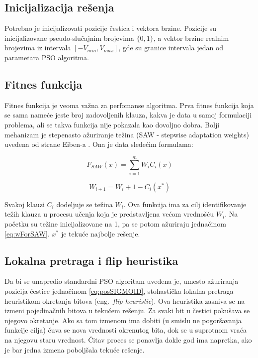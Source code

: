 \documentclass{article}
\begin{document}
\subsection{Inicijalizacija rešenja}
Potrebno je inicijalizovati pozicije čestica i vektora brzine. Pozicije su inicijalizovane pseudo-slučajnim brojevima $\{0,1\}$, a vektor brzine realnim brojevima iz intervala $[-V_{min}, V_{max}]$, gde su granice intervala jedan od parametara PSO algoritma.


\subsection{Fitnes funkcija}
Fitnes funkcija je veoma važna za perfomanse algoritma.
Prva fitnes funkcija koja se sama nameće jeste broj zadovoljenih klauza, kakva je data u samoj formulaciji problema, ali se takva funkcija nije pokazala kao dovoljno dobra. Bolji mehanizam je stepenasto ažuriranje težina (SAW - stepwise adaptation weights) uvedena od strane Eiben-a \cite{fitnes}. Ona je data sledećim formulama:

\begin{equation}\label{eq:SAW}
F_{SAW}(x) = \sum_{i=1}^{m} W_iC_i(x)
\end{equation}

\begin{equation}\label{eq:wForSAW}
W_{i+1} = W_{i} + 1 - C_i(x^*)
\end{equation}

Svakoj klauzi $C_i$ dodeljuje se težina $W_i$. Ova funkcija ima za cilj identifikovanje težih klauza u procesu učenja koja je predstavljena većom vrednošću $W_i$. Na početku su težine inicijalizovane na 1, pa se potom ažuriraju jednačinom \ref{eq:wForSAW}. $x^*$ je tekuće najbolje rešenje.


\subsection{Lokalna pretraga i flip heuristika}
Da bi se unapredio standardni PSO algoritam uvedena je, umesto ažuriranja pozicija čestice jednačinom \ref{eq:posSIGMOID}, stohastička lokalna pretraga heuristikom okretanja bitova (eng.~{\em flip heuristic}).
Ova heuristika zasniva se na izmeni pojedinačnih bitova u tekućem rešenju. Za svaki bit u čestici pokušava se njegovo okretanje. Ako sa tom izmenom ima dobiti (u smislu ne pogoršavanja funkcije cilja) čuva se nova vrednosti okrenutog bita, dok se u suprotnom vraća na njegovu staru vrednost. 
Čitav proces se ponavlja dokle god ima napretka, ako je bar jedna izmena poboljšala tekuće rešenje.
\end{document}
